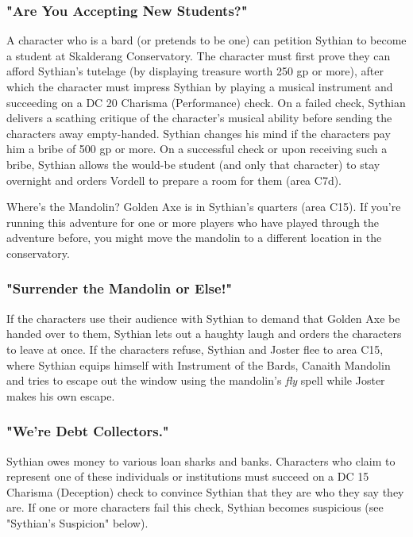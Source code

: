 \documentclass[10pt,a4paper,twoside,bg=print,twocolumn,openany,nodeprecatedcode]{dndbook}
\begin{document}
\subsubsection{"Are You Accepting New Students?"}
A character who is a bard (or pretends to be one) can petition Sythian to become a student at Skalderang Conservatory. The character must first prove they can afford Sythian's tutelage (by displaying treasure worth 250 gp or more), after which the character must impress Sythian by playing a musical instrument and succeeding on a DC 20 Charisma (Performance) check. On a failed check, Sythian delivers a scathing critique of the character's musical ability before sending the characters away empty-handed. Sythian changes his mind if the characters pay him a bribe of 500 gp or more. On a successful check or upon receiving such a bribe, Sythian allows the would-be student (and only that character) to stay overnight and orders Vordell to prepare a room for them (area C7d).

\begin{DndSidebar}[float=!b]{Where's the Mandolin?}
Golden Axe is in Sythian's quarters (area C15). If you're running this adventure for one or more players who have played through the adventure before, you might move the mandolin to a different location in the conservatory.



\end{DndSidebar}

\subsubsection{"Surrender the Mandolin or Else!"}
If the characters use their audience with Sythian to demand that Golden Axe be handed over to them, Sythian lets out a haughty laugh and orders the characters to leave at once. If the characters refuse, Sythian and Joster flee to area C15, where Sythian equips himself with Instrument of the Bards, Canaith Mandolin and tries to escape out the window using the mandolin's \textit{fly} spell while Joster makes his own escape.

\subsubsection{"We're Debt Collectors."}
Sythian owes money to various loan sharks and banks. Characters who claim to represent one of these individuals or institutions must succeed on a DC 15 Charisma (Deception) check to convince Sythian that they are who they say they are. If one or more characters fail this check, Sythian becomes suspicious (see "Sythian's Suspicion" below).
\end{document}
